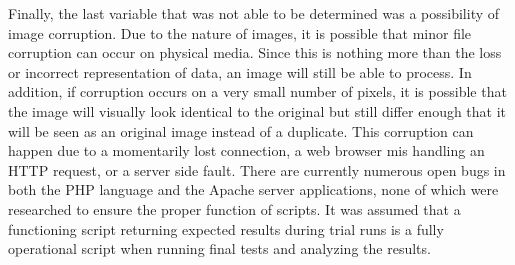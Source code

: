 Finally, the last variable that was not able to be determined was a possibility of image corruption. Due to the nature of images, it is possible that minor file corruption can occur on physical media. Since this is nothing more than the loss or incorrect representation of data, an image will still be able to process. In addition, if corruption occurs on a very small number of pixels, it is possible that the image will visually look identical to the original but still differ enough that it will be seen as an original image instead of a duplicate. This corruption can happen due to a momentarily lost connection, a web browser mis handling an HTTP request, or a server side fault. There are currently numerous open bugs in both the PHP language and the Apache server applications, none of which were researched to ensure the proper function of scripts. It was assumed that a functioning script returning expected results during trial runs is a fully operational script when running final tests and analyzing the results.